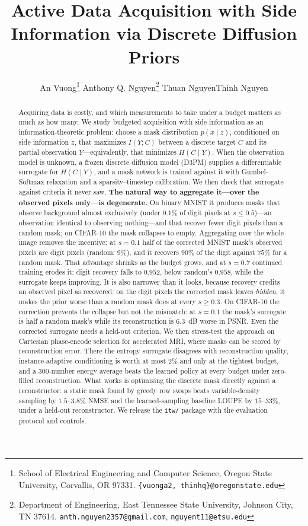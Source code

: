 \documentclass{article}
\title{Active Data Acquisition with Side Information via Discrete Diffusion Priors}
\author{An Vuong\thanks{School of Electrical Engineering and Computer Science,
Oregon State University, Corvallis, OR 97331. \texttt{\{vuonga2,
thinhq\}@oregonstate.edu}} \And Anthony Q. Nguyen\thanks{Department of
Engineering, East Tennessee State University, Johnson City, TN 37614.
\texttt{anth.nguyen2357@gmail.com}, \texttt{nguyent11@etsu.edu}} \And Thuan
Nguyen\footnotemark[2] \And Thinh Nguyen\footnotemark[1]}
\begin{document}
\maketitle

\begin{abstract}
Acquiring data is costly, and which measurements to take under a budget matters as much as how many. We study budgeted acquisition with side information as an information-theoretic problem: choose a mask distribution $p(x \mid z)$, conditioned on side information $z$, that maximizes $I(Y;C)$ between a discrete target $C$ and its partial observation $Y$---equivalently, that minimizes $H(C \mid Y)$. When the observation model is unknown, a frozen discrete diffusion model (D3PM) supplies a differentiable surrogate for $H(C \mid Y)$, and a mask network is trained against it with Gumbel-Softmax relaxation and a sparsity--timestep calibration. We then check that surrogate against criteria it never saw. \textbf{The natural way to aggregate it---over the observed pixels only---is degenerate.} On binary MNIST it produces masks that observe background almost exclusively (under $0.1\%$ of digit pixels at $s \le 0.5$)---an observation identical to observing nothing---and that recover fewer digit pixels than a random mask; on CIFAR-10 the mask collapses to empty. Aggregating over the whole image removes the incentive: at $s = 0.1$ half of the corrected MNIST mask's observed pixels are digit pixels (random: $9\%$), and it recovers $90\%$ of the digit against $75\%$ for a random mask. That advantage shrinks as the budget grows, and at $s = 0.7$ continued training erodes it: digit recovery falls to $0.952$, below random's $0.958$, while the surrogate keeps improving. It is also narrower than it looks, because recovery credits an observed pixel as recovered: on the digit pixels the corrected mask leaves \emph{hidden}, it makes the prior worse than a random mask does at every $s \ge 0.3$. On CIFAR-10 the correction prevents the collapse but not the mismatch: at $s = 0.1$ the mask's surrogate is half a random mask's while its reconstruction is $6.3$~dB worse in PSNR. Even the corrected surrogate needs a held-out criterion. We then stress-test the approach on Cartesian phase-encode selection for accelerated MRI, where masks can be scored by reconstruction error. There the entropy surrogate disagrees with reconstruction quality, instance-adaptive conditioning is worth at most $2\%$ and only at the tightest budget, and a 300-number energy average beats the learned policy at every budget under zero-filled reconstruction. What works is optimizing the discrete mask directly against a reconstructor: a static mask found by greedy row swaps beats variable-density sampling by $1.5$--$3.8\%$ NMSE and the learned-sampling baseline LOUPE by $15$--$33\%$, under a held-out reconstructor. We release the \texttt{itw/} package with the evaluation protocol and controls.
\end{abstract}
\end{document}

